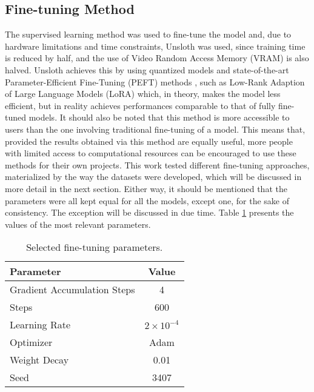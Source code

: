 \documentclass[sigconf]{acmart}
\begin{document}
\subsection{Fine-tuning Method}\label{sec:fineTuning}
The supervised learning method was used to fine-tune the model and, due to hardware limitations and time constraints, Unsloth \cite{Han23} was used, since training time is reduced by half, and the use of Video Random Access Memory (VRAM) is also halved. Unsloth achieves this by using quantized models and state-of-the-art Parameter-Efficient Fine-Tuning (PEFT) methods \cite{Mangrulkar22}, such as Low-Rank Adaption of Large Language Models (LoRA) \cite{Hu21} which, in theory, makes the model less efficient, but in reality achieves performances comparable to that of fully fine-tuned models. It should also be noted that this method is more accessible to users than the one involving traditional fine-tuning of a model. This means that, provided the results obtained via this method are equally useful, more people with limited access to computational resources can be encouraged to use these methods for their own projects. This work tested different fine-tuning approaches, materialized by the way the datasets were developed, which will be discussed in more detail in the next section. Either way, it should be mentioned that the parameters were all kept equal for all the models, except one, for the sake of consistency. The exception will be discussed in due time. Table \ref{tab:params} presents the values of the most relevant parameters.

\begin{table}[h]
  \caption{Selected fine-tuning parameters.}
  \label{tab:params}
  \begin{tabular}{@{}lc@{}}
    \toprule
    \textbf{Parameter} & \textbf{Value} \\
    \midrule
    Gradient Accumulation Steps & 4 \\
    Steps & 600 \\
    Learning Rate & $2 \times 10^{-4}$ \\
    Optimizer & Adam \\
    Weight Decay & 0.01 \\
    Seed & 3407 \\
    \bottomrule
  \end{tabular}
\end{table}
\end{document}
